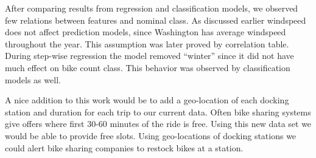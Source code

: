 \documentclass[12pt]{article}
\newcommand{\bibfile}{GroupProject}
\begin{document}

After comparing results from regression and classification models, we observed
few relations between features and nominal class. As discussed earlier
windspeed does not affect prediction models, since Washington has average
windspeed throughout the year. This assumption was later proved by correlation
table. During step-wise regression the model removed ``winter'' since it did not
have much effect on bike count class. This behavior was observed by
classification models as well.



A nice addition to this work would be to add a geo-location of each docking
station and duration for each trip to our current data. Often bike sharing
systems give offers where first 30-60 minutes of the ride is free.  Using this
new data set we would be able to provide free slots.  Using geo-locations
of docking stations we could alert bike sharing companies to restock bikes at a
station.



\end{document}
